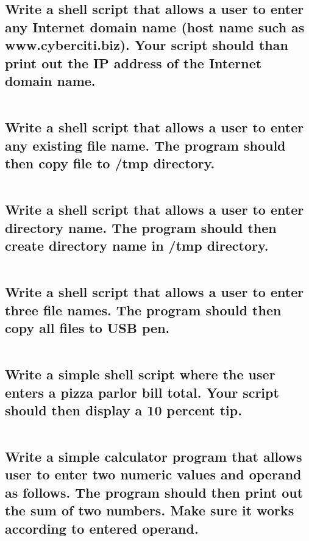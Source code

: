 \inputminted[breaklines, linenos]{shell}{25-09-2020/09.sh}

\subsection{
Write a shell script that allows a user to enter any Internet domain name (host name such as www.cyberciti.biz). Your script should than print out the IP address of the Internet domain name.
}

\inputminted[breaklines, linenos]{shell}{25-09-2020/10.sh}
\subsection{
Write a shell script that allows a user to enter any existing file name. The program should then copy file to /tmp directory.
}

\inputminted[breaklines, linenos]{shell}{25-09-2020/11.sh}
\subsection{
Write a shell script that allows a user to enter directory name. The program should then create directory name in /tmp directory.
}

\inputminted[breaklines, linenos]{shell}{25-09-2020/12.sh}
\subsection{
Write a shell script that allows a user to enter three file names. The program should then copy all files to USB pen.
}

\inputminted[breaklines, linenos]{shell}{25-09-2020/13.sh}
\subsection{
Write a simple shell script where the user enters a pizza parlor bill total. Your script should then display a 10 percent tip.
}

\inputminted[breaklines, linenos]{shell}{25-09-2020/14.sh}

\subsection{
Write a simple calculator program that allows user to enter two numeric values and operand as follows. The program should then print out the sum of two numbers. Make sure it works according to entered operand.
}

